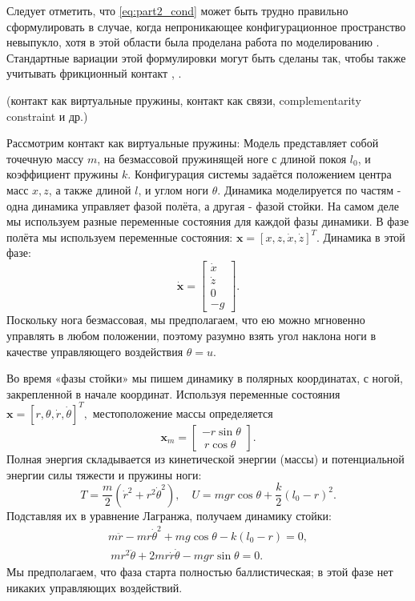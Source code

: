 Следует отметить, что \ref{eq:part2_cond} может быть трудно правильно сформулировать в случае, когда непроникающее конфигурационное пространство невыпукло, хотя в этой области была проделана работа по моделированию \cite{Nguyen2010}. Стандартные вариации этой формулировки могут быть сделаны так, чтобы также учитывать фрикционный контакт \cite{Tassa2012}, \cite{brogliato2012nonsmooth}.

(контакт как виртуальные пружины, контакт как связи, complementarity constraint и др.)

Рассмотрим контакт как виртуальные пружины:
Модель представляет собой точечную массу $m$, на безмассовой пружинящей ноге с длиной покоя $l_0$, и коэффициент пружины $k$. Конфигурация системы задаётся положением центра масс $x, z$, а также длиной $l$, и углом ноги $\theta$. Динамика моделируется по частям - одна динамика управляет фазой полёта, а другая - фазой стойки. На самом деле мы используем разные переменные состояния для каждой фазы динамики. В фазе полёта мы используем переменные состояния: $\mathbf{x} = [x,z,\dot{x},\dot{z}]^T$. Динамика в этой фазе:
\begin{equation}
	\dot{\mathbf{x}} =
	\begin{bmatrix} \dot{x} \\ \dot{z} \\ 0 \\ - g \end{bmatrix}.
\end{equation}
Поскольку нога безмассовая, мы предполагаем, что ею можно мгновенно управлять в любом положении, поэтому разумно взять угол наклона ноги в качестве управляющего воздействия $\theta = u$.

Во время «фазы стойки» мы пишем динамику в полярных координатах, с ногой, закрепленной в начале координат. Используя переменные состояния $\mathbf{x} = [r, \theta, \dot{r}, \dot\theta]^T,$ 
местоположение массы определяется $$\mathbf{x}_m = \begin{bmatrix} - r \sin\theta \\\ r \cos\theta \end{bmatrix}. $$ Полная энергия складывается из кинетической энергии (массы) и потенциальной энергии силы тяжести и пружины ноги: $$T = \frac{m}{2} (\dot{r}^2 + r^2 \dot\theta^2 ), \quad U = mgr\cos\theta + \frac{k}{2}(l_0 - r)^2. $$ Подставляя их в уравнение Лагранжа, получаем динамику стойки: 
\begin{gather*} 
	m \ddot{r} - m r \dot\theta^2 + m g \cos\theta - k (l_0 - r) = 0, \\\ 
	m r^2 \ddot{\theta} + 2mr\dot{r}\dot\theta - mgr \sin\theta = 0.
\end{gather*} 
Мы предполагаем, что фаза старта полностью баллистическая; в этой фазе нет никаких управляющих воздействий.


